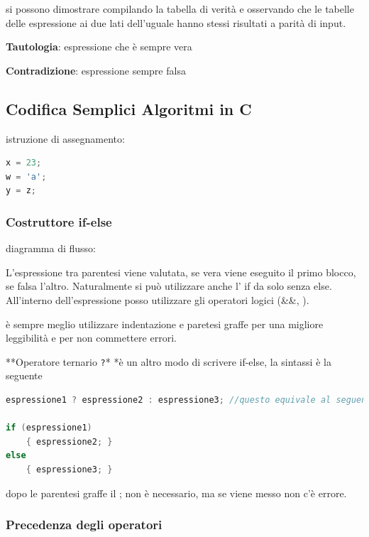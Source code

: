 \documentclass[
  paper=a4,
  oneside  ,captions=tableheading
]{scrbook}
\newcommand{\passthrough}[1]{#1}
\begin{document}
si possono dimostrare compilando la tabella di verità e osservando che
le tabelle delle espressione ai due lati dell'uguale hanno stessi
risultati a parità di input.

\textbf{Tautologia}: espressione che è sempre vera

\textbf{Contradizione}: espressione sempre falsa

\hypertarget{codifica-semplici-algoritmi-in-c}{%
\subsection{Codifica Semplici Algoritmi in
C}\label{codifica-semplici-algoritmi-in-c}}

istruzione di assegnamento:

\begin{lstlisting}[language={C++}]
x = 23;
w = 'a';
y = z;
\end{lstlisting}

\hypertarget{costruttore-if-else}{%
\subsubsection{Costruttore if-else}\label{costruttore-if-else}}

diagramma di flusso:

L'espressione tra parentesi viene valutata, se vera viene eseguito il
primo blocco, se falsa l'altro. Naturalmente si può utilizzare anche l'
if da solo senza else. All'interno dell'espressione posso utilizzare gli
operatori logici (\&\&, \textbar\textbar).

è sempre meglio utilizzare indentazione e paretesi graffe per una
migliore leggibilità e per non commettere errori.

**Operatore ternario \passthrough{\lstinline!?!}* *è un altro modo di
scrivere if-else, la sintassi è la seguente

\begin{lstlisting}[language={C++}]
espressione1 ? espressione2 : espressione3; //questo equivale al seguente if-else

if (espressione1)
    { espressione2; }
else
    { espressione3; }
\end{lstlisting}

dopo le parentesi graffe il ; non è necessario, ma se viene messo non
c'è errore.

\hypertarget{precedenza-degli-operatori}{%
\subsubsection{Precedenza degli
operatori}\label{precedenza-degli-operatori}}
\end{document}
